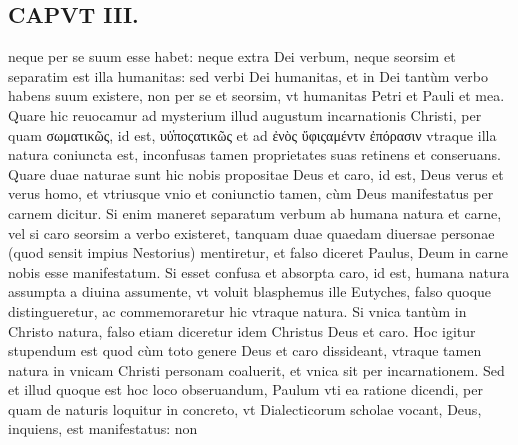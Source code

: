 \documentclass{article}
\begin{document}
\begin{pages}
\section*{CAPVT  III. }\pstart neque per se suum esse habet: neque extra Dei verbum, neque seorsim et separatim est illa humanitas: sed verbi Dei humanitas, et in Dei tantùm verbo habens suum existere, non per se et seorsim, vt humanitas Petri et Pauli et mea. Quare hic reuocamur ad mysterium illud augustum incarnationis Christi, per quam σωματικῶς, id est, υὐ̔ποςατικῶς et ad ἐνὸς ὔφιςαμέντν ἐπόρασιν vtraque illa natura coniuncta est, inconfusas tamen proprietates suas retinens et conseruans. Quare duae naturae sunt hic nobis propositae Deus et caro, id est, Deus verus et verus homo, et vtriusque vnio et coniunctio tamen, cùm Deus manifestatus per carnem dicitur. Si enim maneret separatum verbum ab humana natura et carne, vel si caro seorsim a verbo existeret, tanquam duae quaedam diuersae personae (quod sensit impius Nestorius) mentiretur, et falso diceret Paulus, Deum in carne nobis esse manifestatum. Si esset confusa et absorpta caro, id est, humana natura assumpta a diuina assumente, vt voluit blasphemus ille Eutyches, falso quoque distingueretur, ac commemoraretur hic vtraque natura. Si vnica tantùm in Christo natura, falso etiam diceretur idem Christus Deus et caro. Hoc igitur stupendum est quod cùm toto genere Deus et caro dissideant, vtraque tamen natura in vnicam Christi personam coaluerit, et vnica sit per incarnationem. Sed et illud quoque est hoc loco obseruandum, Paulum vti ea ratione dicendi, per quam de naturis loquitur in concreto, vt Dialecticorum scholae vocant, Deus, inquiens, est manifestatus: non  \pend

\end{pages}
\end{document}
